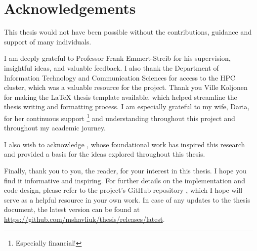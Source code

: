 \chapter*{Acknowledgements}

This thesis would not have been possible without the contributions, guidance and support of many individuals.

I am deeply grateful to Professor Frank Emmert-Streib for his supervision, insightful ideas, and valuable feedback. I also thank the Department of Information Technology and Communication Sciences for access to the HPC cluster, which was a valuable resource for the project.
Thank you Ville Koljonen for making the LaTeX thesis template available, which helped streamline the thesis writing and formatting process. I am especially grateful to my wife, Daria, for her continuous support \footnote{Especially financial!} and understanding throughout this project and throughout my academic journey.

I also wish to acknowledge \citeauthor{STraTS2022}, whose foundational work has inspired this research and provided a basis for the ideas explored throughout this thesis.

Finally, thank you to you, the reader, for your interest in this thesis. I hope you find it informative and inspiring. For further details on the implementation and code design, please refer to the project's GitHub repository , which I hope will serve as a helpful resource in your own work. In case of any updates to the thesis document, the latest version can be found at \url{https://github.com/mshavliuk/thesis/releases/latest}.



\clearpage

